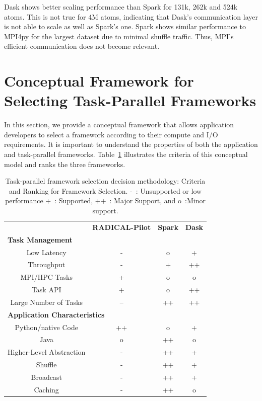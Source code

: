 Dask shows better scaling performance than Spark for 131k, 262k and 524k atoms. This
is not true for 4M atoms, indicating that Dask's communication layer is not
able to scale as well as Spark's one. Spark shows similar performance to MPI4py
for the largest dataset due to minimal shuffle traffic. Thus, MPI's efficient
communication does not become relevant.

\section{Conceptual Framework for Selecting Task-Parallel Frameworks}
\label{sec:task_sel_model}

In this section, we provide a conceptual framework that allows application
developers to select a framework according to their compute and I/O
requirements. It is important to understand the properties of both the
application and task-parallel frameworks. Table~\ref{tab:framework} illustrates
the criteria of this conceptual model and ranks the three frameworks.

\begin{table}[t]
    \scriptsize
    \centering
    \begin{tabular}{@{}cccc@{}}
        \toprule
        &\textbf{RADICAL-Pilot}     &\textbf{Spark} &\textbf{Dask}\\
        \multicolumn{4}{l}{\textbf{Task Management}} \\
        \midrule
        Low Latency   &- &o &+\\
        Throughput    &- &+ &++\\
        MPI/HPC Tasks &+ &o &o\\
        Task API   &+ &o &++\\
        Large Number of Tasks   &-- &++ &++\\\hline
        \multicolumn{4}{l}{\textbf{Application Characteristics}}\\\midrule
        Python/native Code &++ &o &+\\
        Java               &o &++ &o\\
        Higher-Level Abstraction &- &++ &+\\
        Shuffle                  &- &++ &+\\
        Broadcast                &- &++ &+\\
        Caching                  &- &++ &o\\
        \bottomrule
    \end{tabular}
    \caption{Task-parallel framework selection decision methodology: Criteria
        and Ranking for Framework Selection. -~: Unsupported or low performance
        +~: Supported, ++~: Major Support, and o~:Minor
        support.\label{tab:framework}}
\end{table}

